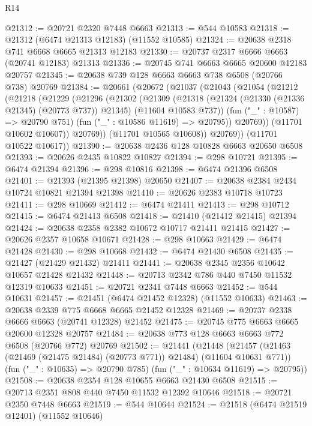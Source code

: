 \begin{lexlean}{R14}
\begin{coremodule}
@21312 := @20721 @2320 @7448 @6663
@21313 := @544 @10583
@21318 := @21312 (@6474 @21313 @12183) (@11552 @10585)
@21324 := @20638 @2318 @741 @6668 @6665 @21313 @12183
@21330 := @20737 @2317 @6666 @6663 (@20741 @12183) @21313
@21336 := @20745 @741 @6663 @6665 @20600 @12183 @20757
@21345 := @20638 @739 @128 @6663 @6663 @738 @6508 (@20766 @738) @20769
@21384 := @20661
    (@20672
      (@21037
        (@21043
          (@21054
            (@21212
              (@21218
                (@21229
                  (@21296
                    (@21302
                      (@21309
                        (@21318
                          (@21324 (@21330 (@21336 @21345) (@20773 @737)) @21345)
                          (@11604 @10583 @737))
                        (fun ("_" : @10587) => @20790 @751)
                        (fun ("_" : @10586 @11619) => @20795))
                      @20769))
                  (@11701 @10602 @10607))
                @20769))
            (@11701 @10565 @10608))
          @20769))
      (@11701 @10522 @10617))
@21390 := @20638 @2436 @128 @10828 @6663 @20650 @6508
@21393 := @20626 @2435 @10822 @10827
@21394 := @298 @10721
@21395 := @6474 @21394
@21396 := @298 @10816
@21398 := @6474 @21396 @6508
@21401 := @21393 (@21395 @21398) @20650
@21407 := @20638 @2384 @2434 @10724 @10821 @21394 @21398
@21410 := @20626 @2383 @10718 @10723
@21411 := @298 @10669
@21412 := @6474 @21411
@21413 := @298 @10712
@21415 := @6474 @21413 @6508
@21418 := @21410 (@21412 @21415) @21394
@21424 := @20638 @2358 @2382 @10672 @10717 @21411 @21415
@21427 := @20626 @2357 @10658 @10671
@21428 := @298 @10663
@21429 := @6474 @21428
@21430 := @298 @10668
@21432 := @6474 @21430 @6508
@21435 := @21427 (@21429 @21432) @21411
@21441 := @20638 @2345 @2356 @10642 @10657 @21428 @21432
@21448 := @20713 @2342 @786 @440 @7450 @11532 @12319 @10633
@21451 := @20721 @2341 @7448 @6663
@21452 := @544 @10631
@21457 := @21451 (@6474 @21452 @12328) (@11552 @10633)
@21463 := @20638 @2339 @775 @6668 @6665 @21452 @12328
@21469 := @20737 @2338 @6666 @6663 (@20741 @12328) @21452
@21475 := @20745 @775 @6663 @6665 @20600 @12328 @20757
@21484 := @20638 @773 @128 @6663 @6663 @772 @6508 (@20766 @772) @20769
@21502 := @21441
    (@21448
      (@21457 (@21463 (@21469 (@21475 @21484) (@20773 @771)) @21484) (@11604 @10631 @771))
      (fun ("_" : @10635) => @20790 @785)
      (fun ("_" : @10634 @11619) => @20795))
@21508 := @20638 @2354 @128 @10655 @6663 @21430 @6508
@21515 := @20713 @2351 @808 @440 @7450 @11532 @12392 @10646
@21518 := @20721 @2350 @7448 @6663
@21519 := @544 @10644
@21524 := @21518 (@6474 @21519 @12401) (@11552 @10646)

\end{coremodule}
\end{lexlean}
